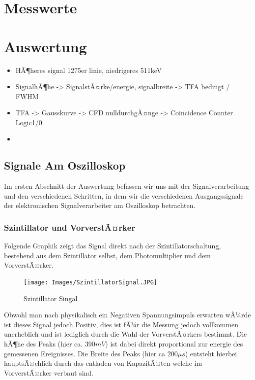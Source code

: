 \documentclass{article}
\begin{document}
    \section{Messwerte}

    \section{Auswertung}
        \begin{itemize}
            \item HÃ¶heres signal 1275er linie, niedrigeres 511keV
            \item SignalhÃ¶he -> SignalstÃ¤rke/energie, signalbreite -> TFA bedingt / FWHM
            \item TFA -> Gausskurve -> CFD nulldurchgÃ¤nge -> Coincidence Counter Logic1/0
            \item
        \end{itemize}

        \subsection{Signale Am Oszilloskop}
            Im ersten Abschnitt der Auswertung befassen wir uns mit der Signalverarbeitung und den verschiedenen
            Schritten, in dem wir die verschiedenen Ausgangssignale der elektronischen Signalverarbeiter am Oszilloskop betrachten.


            \subsubsection{Szintillator und VorverstÃ¤rker}
                Folgende Graphik zeigt das Signal direkt nach der Szintillatorschaltung, bestehend aus
                dem Szintillator selbst, dem Photomultiplier und dem VorverstÃ¤rker.
                \begin{figure}[H]
                    \centering
                    \texttt{[image: Images/SzintillatorSignal.JPG]}
                    \caption{Szintillator Singal}
                \end{figure}
                Obwohl man nach physikalisch ein Negativen Spannungsimpuls erwarten wÃ¼rde ist dieses Signal jedoch Positiv, dies ist fÃ¼r die
                Messung jedoch vollkommen unerheblich und ist lediglich durch die Wahl der VorverstÃ¤rkers bestimmt.
                Die hÃ¶he des Peaks (hier ca. $390mV$) ist dabei direkt proportional zur energie des gemessenen
                Ereignisses. Die Breite des Peaks (hier ca $200\mu s$) entsteht hierbei hauptsÃ¤chlich durch das entladen von KapazitÃ¤ten
                welche im VorverstÃ¤rker verbaut sind.
\end{document}
